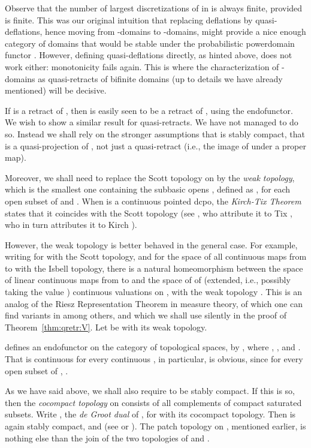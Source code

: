 \documentclass{LMCS}
\begin{document}
Observe that the number of largest discretizations of  in
 is always finite, provided  is finite.
This was our original intuition that replacing deflations by
quasi-deflations, hence moving from -domains to -domains,
might provide a nice enough category of domains that would be stable
under the probabilistic powerdomain functor .  However,
defining quasi-deflations directly, as hinted above, does not work
either: monotonicity fails again.  This is where the characterization
of -domains as quasi-retracts of bifinite domains (up to details
we have already mentioned) will be decisive.


If  is a retract of , then  is easily seen to be a
retract of , using the  endofunctor.  We wish to
show a similar result for quasi-retracts.  We have not managed to do
so.  Instead we shall rely on the stronger assumptions that  is
stably compact, that  is a quasi-projection of , not just a
quasi-retract (i.e., the image of  under a proper map).

Moreover, we shall need to replace the Scott topology on 
by the {\em weak topology\/}, which is the smallest one containing the
subbasic opens , defined as , for each open subset  of  and .  When
 is a continuous pointed dcpo, the \emph{Kirch-Tix Theorem} states
that it coincides with the Scott topology (see \cite{AMJK:scs:prob},
who attribute it to Tix \cite[Satz~4.10]{Tix:bewertung}, who in turn
attributes it to Kirch \cite[Satz~8.6]{Kirch:bewertung}).

However, the weak topology is better behaved in the general case.  For
example, writing  for  with the
Scott topology, and  for the space of all
continuous maps from  to  with the Isbell topology, there
is a natural homeomorphism between the space of linear continuous maps
from  to  and the space of of
(extended, i.e., possibly taking the value ) continuous
valuations on , with the weak topology
\cite[Theorem~8.1]{Heckmann:space:val}.  This is an analog of the
Riesz Representation Theorem in measure theory, of which one can find
variants in \cite{Tix:bewertung,Gou-csl07} among others, and which we
shall use silently in the proof of Theorem~\ref{thm:qretr:V}.  Let
 be  with its weak topology.

 defines an endofunctor on the category of topological
spaces, by , where , , and .  That
 is continuous for every continuous , in
particular, is obvious, since for every open subset  of ,
.

As we have said above, we shall also require  to be stably compact.
If this is so, then the \emph{cocompact topology} on  consists of
all complements of compact saturated subsets.  Write , the
\emph{de Groot dual} of , for  with its cocompact topology.
Then  is again stably compact, and  (see
\cite[Corollary~12]{AMJK:scs:prob} or
\cite[Corollary~VI-6.19]{GHKLMS:contlatt}).  The patch topology on
, mentioned earlier, is nothing else than the join of the two
topologies of  and .
\end{document}
